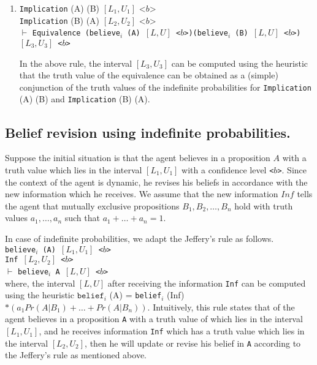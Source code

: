\documentclass[12pt]{article}
\begin{document}
\begin{enumerate}
\item
\texttt{Implication} (A) (B) $[L_1,U_1]$ <$b$>\\
\texttt{Implication} (B) (A) $[L_2,U_2]$ <$b$>\\
$\vdash$
\texttt{Equivalence (believe$_i$ (A) $[L,U]$ <$b$>)}\texttt{(believe$_i$ (B) $[L,U]$ <$b$>) $[L_3,U_3]$ <$b$>}

In the above rule, the interval $[L_3,U_3]$ can be computed using the heuristic that the truth value of the equivalence can be obtained as a (simple) conjunction of the truth values of the indefinite probabilities for \texttt{Implication} (A) (B) and \texttt{Implication} (B) (A).

\end{enumerate}

\subsection{Belief revision using indefinite probabilities.}  Suppose the initial situation is that the agent believes in a proposition $A$ with a truth value which lies in the interval $[L_1,U_1]$ with a confidence level \texttt{<$b$>}. Since the context of the agent is dynamic, he revises his beliefs in accordance with the new information which he receives. We assume that the new information $Inf$ tells the agent that mutually exclusive propositions $B_1, B_2, \ldots, B_n$ hold with truth values $a_1,\ldots,a_n$ such that $a_1+\ldots+a_n=1$. 


In case of indefinite probabilities, we adapt the Jeffery's rule \cite{Jeffrey1983} as follows.\\

\noindent \texttt{believe$_i$ (A) $[L_1,U_1]$ <$b$>}\\
\noindent \texttt{Inf $[L_2,U_2]$ <$b$>}\\
$\vdash$
\noindent \texttt{believe$_i$ A $[L,U]$ <$b$>}\\

where, the interval $[L,U]$ after receiving the information \texttt{Inf} can be computed using the heuristic $\texttt{belief}_i$ (A) = \texttt{belief}$_i$ (Inf) $\ast (a_1 Pr(A|B_1) + \ldots + Pr(A|B_n))$. Intuitively, this rule states that of the agent believes in a proposition \texttt{A} with a truth value of which lies in the interval $[L_1,U_1]$, and he receives information \texttt{Inf} which has a truth value which lies in the interval $[L_2,U_2]$, then he will update or revise his belief in \texttt{A} according to the Jeffery's rule as mentioned above. \\
\end{document}
